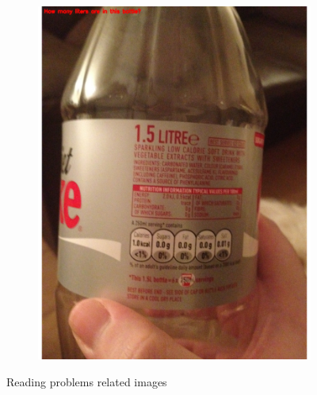 \documentclass[sigconf]{acmart}
\begin{document}
\begin{figure}[hbp]
\begin{subfigure}[b]{0.3\columnwidth}
                \includegraphics[scale=0.3]{images/reading_3.pdf}  
        \end{subfigure}%
       
        \caption{Reading problems related images} 
        \label{fig:reading}
\end{figure}
\end{document}
